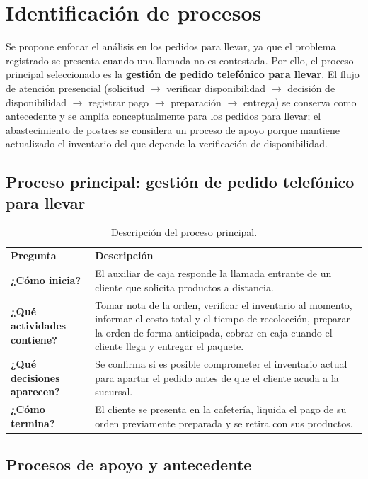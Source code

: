 \documentclass[12pt,letterpaper]{article}
\newcommand{\thd}[1]{\sffamily\bfseries #1}
\newcommand{\cab}{\rowcolor{black!18}}
\begin{document}
\section{Identificación de procesos}

Se propone enfocar el análisis en los pedidos para llevar, ya que el problema registrado se presenta cuando una llamada no es contestada. Por ello, el proceso principal seleccionado es la \textbf{gestión de pedido telefónico para llevar}. El flujo de atención presencial (solicitud $\rightarrow$ verificar disponibilidad $\rightarrow$ decisión de disponibilidad $\rightarrow$ registrar pago $\rightarrow$ preparación $\rightarrow$ entrega) se conserva como antecedente y se amplía conceptualmente para los pedidos para llevar; el abastecimiento de postres se considera un proceso de apoyo porque mantiene actualizado el inventario del que depende la verificación de disponibilidad.

\subsection{Proceso principal: gestión de pedido telefónico para llevar}

\begin{table}[H]
\centering
\begin{tabularx}{\textwidth}{>{\bfseries}p{4cm}Y}
\cab \thd{Pregunta} & \thd{Descripción}\\
¿Cómo inicia? & El auxiliar de caja responde la llamada entrante de un cliente que solicita productos a distancia.\\
¿Qué actividades contiene? & Tomar nota de la orden, verificar el inventario al momento, informar el costo total y el tiempo de recolección, preparar la orden de forma anticipada, cobrar en caja cuando el cliente llega y entregar el paquete.\\
¿Qué decisiones aparecen? & Se confirma si es posible comprometer el inventario actual para apartar el pedido antes de que el cliente acuda a la sucursal.\\
¿Cómo termina? & El cliente se presenta en la cafetería, liquida el pago de su orden previamente preparada y se retira con sus productos.\\
\end{tabularx}
\caption{Descripción del proceso principal.}
\end{table}

\subsection{Procesos de apoyo y antecedente}
\end{document}
